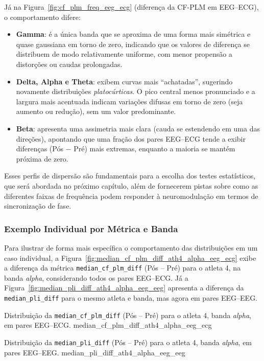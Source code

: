 Já na Figura~\ref{fig:cf_plm_freq_eeg_ecg} (diferença da CF-PLM em EEG--ECG), o comportamento difere:
\begin{itemize}
    \item \textbf{Gamma}: é a única banda que se aproxima de uma forma mais simétrica e quase gaussiana em torno de zero, indicando que os valores de diferença se distribuem de modo relativamente uniforme, com menor propensão a distorções ou caudas prolongadas.
    \item \textbf{Delta, Alpha e Theta}: exibem curvas mais “achatadas”, sugerindo novamente distribuições \emph{platocúrticas}. O pico central menos pronunciado e a largura mais acentuada indicam variações difusas em torno de zero (seja aumento ou redução), sem um valor predominante.
    \item \textbf{Beta}: apresenta uma assimetria mais clara (cauda se estendendo em uma das direções), apontando que uma fração dos pares EEG--ECG tende a exibir diferenças (Pós $-$ Pré) mais extremas, enquanto a maioria se mantém próxima de zero.
\end{itemize}

Esses perfis de dispersão são fundamentais para a escolha dos testes estatísticos, que será abordada no próximo capítulo, além de fornecerem pistas sobre como as diferentes faixas de frequência podem responder à neuromodulação em termos de sincronização de fase.

\subsubsection{Exemplo Individual por Métrica e Banda}
Para ilustrar de forma mais específica o comportamento das distribuições em um caso individual, a Figura~\ref{fig:median_cf_plm_diff_ath4_alpha_eeg_ecg} exibe a diferença da métrica \texttt{median\_cf\_plm\_diff} (Pós -- Pré) para o atleta 4, na banda \emph{alpha}, considerando todos os pares EEG--ECG. Já a Figura~\ref{fig:median_pli_diff_ath4_alpha_eeg_eeg} apresenta a diferença da \texttt{median\_pli\_diff} para o mesmo atleta e banda, mas agora em pares EEG--EEG.

{Distribuição da \texttt{median\_cf\_plm\_diff} (Pós -- Pré) para o atleta 4, banda \emph{alpha}, em pares EEG--ECG.}
{median_cf_plm_diff_ath4_alpha_eeg_ecg}

{Distribuição da \texttt{median\_pli\_diff} (Pós -- Pré) para o atleta 4, banda \emph{alpha}, em pares EEG--EEG.}
{median_pli_diff_ath4_alpha_eeg_eeg}

